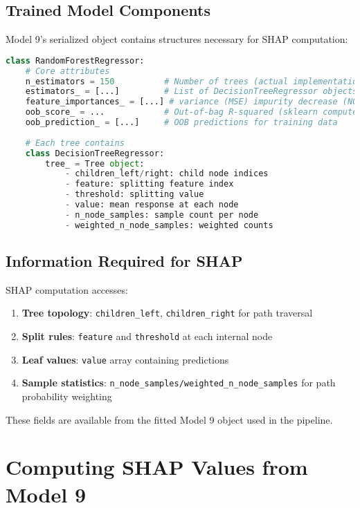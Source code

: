 \subsection{Trained Model Components}
Model 9's serialized object contains structures necessary for SHAP computation:
%
\begin{lstlisting}[language=Python, caption=Random Forest Model Object Structure]
class RandomForestRegressor:
    # Core attributes
    n_estimators = 150          # Number of trees (actual implementation)
    estimators_ = [...]         # List of DecisionTreeRegressor objects
    feature_importances_ = [...] # variance (MSE) impurity decrease (NOT causal)
    oob_score_ = ...            # Out-of-bag R-squared (sklearn computes $R^2$ by default)
    oob_prediction_ = [...]     # OOB predictions for training data
    
    # Each tree contains
    class DecisionTreeRegressor:
        tree_ = Tree object:
            - children_left/right: child node indices
            - feature: splitting feature index
            - threshold: splitting value
            - value: mean response at each node
            - n_node_samples: sample count per node
            - weighted_n_node_samples: weighted counts
\end{lstlisting}

\subsection{Information Required for SHAP}
SHAP computation accesses:
%
\begin{enumerate}
    \item \textbf{Tree topology}: \texttt{children\_left}, \texttt{children\_right} for path traversal
    \item \textbf{Split rules}: \texttt{feature} and \texttt{threshold} at each internal node
    \item \textbf{Leaf values}: \texttt{value} array containing predictions
    \item \textbf{Sample statistics}: \texttt{n\_node\_samples/weighted\_n\_node\_samples} for path probability weighting
\end{enumerate}
%
These fields are available from the fitted Model 9 object used in the pipeline.

\section{Computing SHAP Values from Model 9}
